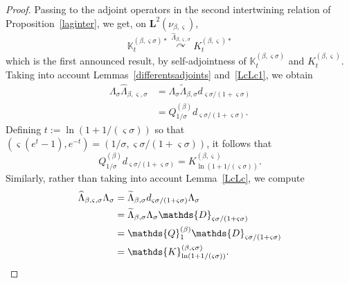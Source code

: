 \documentclass[AHL,Unicode,longabstracts]{cedram}
\newcommand{\df}{\mathrel{:=}}
\newcommand{\wi}{\widetilde}
\newcommand{\wit}{\widehat}
\newcommand{\dBs}{{\discret{Q}}}
\newcommand{\dLs}{{\discret{K}}}
\newcommand{\Ls}{K}
\newcommand{\esL}{\mathbf{L}}
\newcommand{\discret}[1]{\mathds{#1}}
\newcommand{\Gate}[3]{#1\stackrel{#2}{\curvearrowright}#3}
\begin{document}
\begin{proof}
Passing to the adjoint operators in the second intertwining relation of Proposition~\ref{laginter}, we get, on $\esL^2(\nu_{\beta,\varsigma})$,
\[
\Gate{\dLs_{t}^{(\beta,\varsigma\sigma)*}}{\wit \Lambda_{\beta,\varsigma,\sigma}}{\Ls_{t}^{(\beta,\varsigma)*}}
\]
which is the first announced result, by self-adjointness of $\dLs_{t}^{(\beta,\varsigma\sigma)}$ and $\Ls_{t}^{(\beta,\varsigma)}$. Taking into account Lemmas~\ref{differentsadjoints} and~\ref{LcLc1}, we obtain
\begin{align*}
\Lambda_\sigma\wit \Lambda_{\beta,\varsigma,\sigma}&=\Lambda_\sigma\wi \Lambda_{\beta,\sigma}d_{\varsigma\sigma/(1+\varsigma\sigma)}\\
&=Q_{1/\sigma}^{(\beta)}d_{\varsigma\sigma/(1+\varsigma\sigma)}.
\end{align*}
Defining $t\df\ln(1+1/(\varsigma\sigma))$ so that $ (\varsigma(e^t-1),e^{-t})=(1/\sigma,\varsigma\sigma/(1+\varsigma\sigma))$, it follows that
\[
Q_{1/\sigma}^{(\beta)}d_{\varsigma\sigma/(1+\varsigma\sigma)}=K^{(\beta,\varsigma)}_{\ln(1+1/(\varsigma\sigma))}.
\]
Similarly, rather than taking into account Lemma~\ref{LcLc}, we compute
\begin{align*}
\wit \Lambda_{\beta,\varsigma,\sigma}\Lambda_\sigma&=\wi \Lambda_{\beta,\sigma}d_{\varsigma\sigma/(1+\varsigma\sigma)}\Lambda_\sigma\\
&=\wi \Lambda_{\beta,\sigma}\Lambda_\sigma\discret{D}_{\varsigma\sigma/(1+\varsigma\sigma)}\\
&=\dBs^{(\beta)}_1\discret{D}_{\varsigma\sigma/(1+\varsigma\sigma)}\\
&=\dLs^{(\beta,\varsigma\sigma)}_{\ln(1+1/(\varsigma\sigma))}.\qedhere
\end{align*}
\end{proof}
\end{document}
